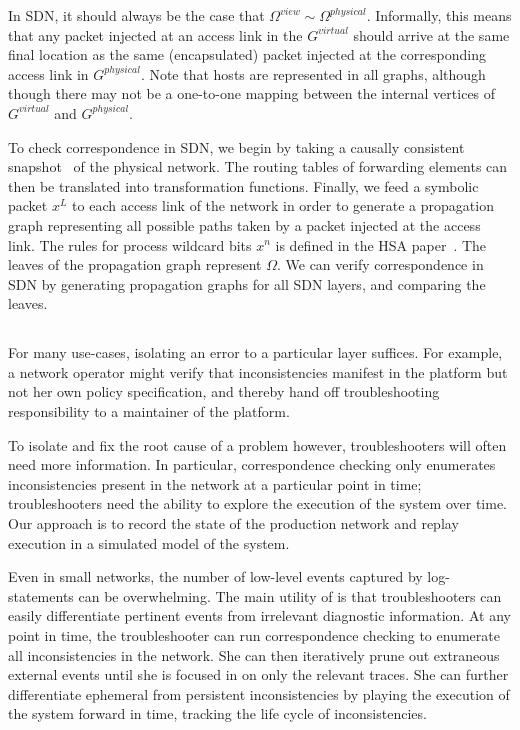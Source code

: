 In SDN, it should always be the case that 
$\Omega^{view} \sim \Omega^{physical}$. Informally, this means that
any packet injected at an access link in the $G^{virtual}$ should arrive at
the same final location as the same (encapsulated) packet injected at the
corresponding access link in $G^{physical}$. Note that hosts are represented
in all graphs, although though there may not be a one-to-one mapping between the
internal vertices of $G^{virtual}$ and $G^{physical}$.

To check correspondence in SDN, we begin by taking a causally consistent
snapshot~\cite{Chandy:1985:DSD:214451.214456} of the physical network. The routing
tables of forwarding elements can then be translated into transformation functions.
Finally, we feed a symbolic packet $x^L$ to each access link of the network in
order to generate
a propagation graph representing all possible paths taken by a packet injected
at the access link. The rules for process wildcard bits $x^n$ is defined in
the HSA paper~\cite{hsa}. The leaves of the propagation graph represent $\Omega$. We
can verify correspondence in SDN by generating propagation graphs for all SDN layers,
and comparing the leaves.

\subsection{\SIMULATOR{}}

For many use-cases, isolating an error to a particular layer suffices.
For example, a network operator might verify that inconsistencies manifest in
the platform but not her own policy specification, and thereby hand off
troubleshooting responsibility to a maintainer of the platform. 

To isolate and fix the root cause of a problem however, troubleshooters will often
need more information. In particular, correspondence checking only enumerates
inconsistencies present in the network at a particular point in time;
troubleshooters need the ability to explore the execution of the system over
time. Our approach is to record the state of the production network and replay 
execution in a simulated model of the system.

Even in small networks,
the number of low-level events captured by
log-statements can be overwhelming. The main utility of \simulator is that
troubleshooters can easily differentiate pertinent events from
irrelevant diagnostic information. At any point in time, the troubleshooter
can run correspondence checking to enumerate all inconsistencies in the
network. She can then iteratively prune out extraneous external events until
she is focused in on only the relevant traces. She can further differentiate
ephemeral from persistent inconsistencies by playing the execution of the
system forward in time, tracking the life cycle of inconsistencies.

